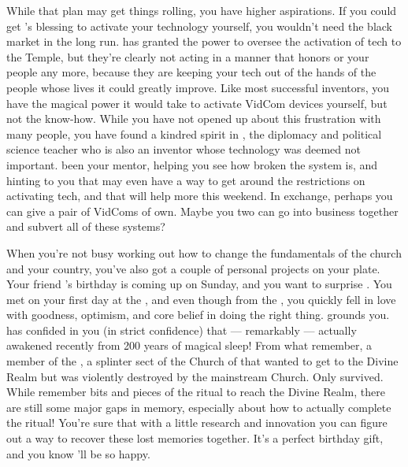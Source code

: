 \documentclass[char]{GL2020}
\begin{document}
While that plan may get things rolling, you have higher aspirations. If you could get \cTechGod{}'s blessing to activate your technology yourself, you wouldn't need the black market in the long run. \cTechGod{} has granted the power to oversee the activation of tech to the Temple, but they're clearly not acting in a manner that honors \cTechGod{} or your people any more, because they are keeping your tech out of the hands of the people whose lives it could greatly improve. Like most successful inventors, you have the magical power it would take to activate VidCom devices yourself, but not the know-how. While you have not opened up about this frustration with many people, you have found a kindred spirit in \cChupInventor{\full}, the diplomacy and political science teacher who is also an inventor whose technology was deemed not important. \cChupInventor{\Theyhave} been your mentor, helping you see how broken the system is, and hinting to you that \cChupInventor{\they} may even have a way to get around the restrictions on activating tech, and that \cChupInventor{\they} will help more this weekend. In exchange, perhaps you can give \cChupInventor{\them} a pair of VidComs of \cChupInventor{\their} own. Maybe you two can go into business together and subvert all of these systems?

When you're not busy working out how to change the fundamentals of the church and your country, you've also got a couple of personal projects on your plate. Your friend \cDisney{\full}'s birthday is coming up on Sunday, and you want to surprise \cDisney{\them}. You met \cDisney{} on your first day at the \pSc{}, and even though \cDisney{\theyare} from the \pFarm{}, you quickly fell in love with \cDisney{\their} goodness, optimism, and core belief in doing the right thing. \cDisney{} grounds you. \cDisney{} has confided in you (in strict confidence) that — remarkably — \cDisney{\theywere} actually awakened recently from 200 years of magical sleep! From what \cDisney{\they} remember\cDisney{\verbs}, \cDisney{\theyare} a member of the \cDisneySect{}, a splinter sect of the Church of \cFarmGod{} that wanted to get to the Divine Realm but was violently destroyed by the mainstream Church. Only \cDisney{\they} survived. While \cDisney{\they} remember\cDisney{\verbs} bits and pieces of the ritual to reach the Divine Realm, there are still some major gaps in \cDisney{\their} memory, especially about how to actually complete the ritual! You're sure that with a little research and innovation you can figure out a way to recover these lost memories together. It's a perfect birthday gift, and you know \cDisney{\they}'ll be so happy.
\end{document}
